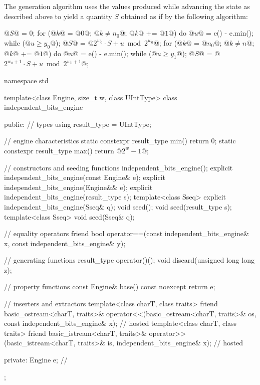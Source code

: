 \pnum
The generation algorithm
uses the values produced
while advancing the state as described above
to yield a quantity $S$
obtained as if by the following algorithm:
\begin{codeblock}
@$S$@ = 0;
for (@$k$@ = @$0$@; @$k \neq n_0$@; @$k$@ += @$1$@)  {
 do @$u$@ = e() - e.min(); while (@$u \ge y_0$@);
 @$S$@ = @$2^{w_0} \cdot S + u \bmod 2^{w_0}$@;
}
for (@$k$@ = @$n_0$@; @$k \neq n$@; @$k$@ += @$1$@)  {
 do @$u$@ = e() - e.min(); while (@$u \ge y_1$@);
 @$S$@ = @$2^{w_0 + 1} \cdot S + u \bmod 2^{w_0 + 1}$@;
}
\end{codeblock}

%
%
\begin{codeblock}
namespace std {
  template<class Engine, size_t w, class UIntType>
  class independent_bits_engine {
  public:
    // types
    using result_type = UIntType;

    // engine characteristics
    static constexpr result_type min() { return 0; }
    static constexpr result_type max() { return @$2^w - 1$@; }

    // constructors and seeding functions
    independent_bits_engine();
    explicit independent_bits_engine(const Engine& e);
    explicit independent_bits_engine(Engine&& e);
    explicit independent_bits_engine(result_type s);
    template<class Sseq> explicit independent_bits_engine(Sseq& q);
    void seed();
    void seed(result_type s);
    template<class Sseq> void seed(Sseq& q);

    // equality operators
    friend bool operator==(const independent_bits_engine& x, const independent_bits_engine& y);

    // generating functions
    result_type operator()();
    void discard(unsigned long long z);

    // property functions
    const Engine& base() const noexcept { return e; }

    // inserters and extractors
    template<class charT, class traits>
      friend basic_ostream<charT, traits>&
        operator<<(basic_ostream<charT, traits>& os, const independent_bits_engine& x); // hosted
    template<class charT, class traits>
      friend basic_istream<charT, traits>&
        operator>>(basic_istream<charT, traits>& is, independent_bits_engine& x);       // hosted

  private:
    Engine e;   // \expos
  };
}
\end{codeblock}%

